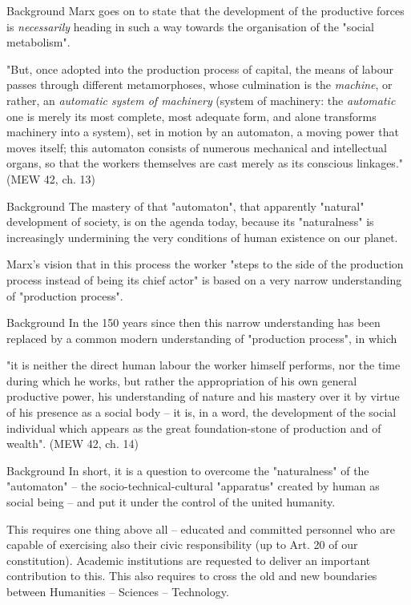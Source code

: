 \documentclass{beamer}
\begin{document}
\begin{frame}{Background}
Marx goes on to state that the development of the productive forces is
\emph{necessarily} heading in such a way towards the organisation of the
"social metabolism".

"But, once adopted into the production process of capital, the means of labour
passes through different metamorphoses, whose culmination is the
\emph{machine}, or rather, an \emph{automatic system of machinery} (system of
machinery: the \emph{automatic} one is merely its most complete, most adequate
form, and alone transforms machinery into a system), set in motion by an
automaton, a moving power that moves itself; this automaton consists of
numerous mechanical and intellectual organs, so that the workers themselves
are cast merely as its conscious linkages." (MEW 42, ch. 13)
\end{frame}

\begin{frame}{Background}
The mastery of that "automaton", that apparently "natural" development of
society, is on the agenda today, because its "naturalness" is increasingly
undermining the very conditions of human existence on our planet.

Marx's vision that in this process the worker "steps to the side of the
production process instead of being its chief actor" is based on a very narrow
understanding of "production process".
\end{frame}

\begin{frame}{Background}
In the 150 years since then this narrow understanding has been replaced by a
common modern understanding of "production process", in which

"it is neither the direct human labour the worker himself performs, nor the
time during which he works, but rather the appropriation of his own general
productive power, his understanding of nature and his mastery over it by
virtue of his presence as a social body – it is, in a word, the development of
the social individual which appears as the great foundation-stone of
production and of wealth". (MEW 42, ch. 14)
\end{frame}

\begin{frame}{Background}
In short, it is a question to overcome the "naturalness" of the "automaton" --
the socio-technical-cultural "apparatus" created by human as social being  --
and put it under the control of the united humanity.

This requires one thing above all -- educated and committed personnel who are
capable of exercising also their civic responsibility (up to Art. 20 of our
constitution).  Academic institutions are requested to deliver an important
contribution to this.  This also requires to cross the old and new boundaries
between Humanities -- Sciences -- Technology.
\end{frame}
\end{document}
